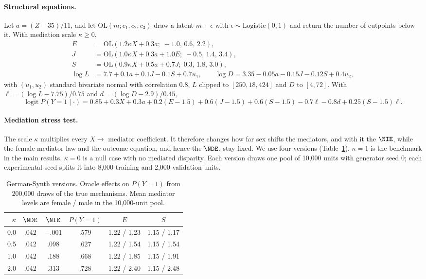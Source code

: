 \paragraph{Structural equations.}
Let $a=(Z-35)/11$, and let $\mathrm{OL}(m;c_1,c_2,c_3)$ draw a latent
$m+\epsilon$ with $\epsilon\sim\mathrm{Logistic}(0,1)$ and return the number
of cutpoints below it. With mediation scale $\kappa\ge0$,
\begin{align*}
  E &= \mathrm{OL}(1.2\kappa X+0.3a;\;-1.0,\,0.6,\,2.2),\\
  J &= \mathrm{OL}(1.0\kappa X+0.3a+1.0E;\;-0.5,\,1.4,\,3.4),\\
  S &= \mathrm{OL}(0.9\kappa X+0.5a+0.7J;\;0.3,\,1.8,\,3.0),\\
  \log L &= 7.7+0.1a+0.1J-0.1S+0.7u_1,\qquad
  \log D = 3.35-0.05a-0.15J-0.12S+0.4u_2,
\end{align*}
with $(u_1,u_2)$ standard bivariate normal with correlation $0.8$, $L$
clipped to $[250,18{,}424]$ and $D$ to $[4,72]$. With
$\ell=(\log L-7.75)/0.75$ and $d=(\log D-2.9)/0.45$,
\begin{equation*}
  \operatorname{logit}P(Y=1\mid\cdot)=0.85+0.3X+0.3a+0.2(E-1.5)+0.6(J-1.5)
  +0.6(S-1.5)-0.7\ell-0.8d+0.25(S-1.5)\ell .
\end{equation*}

\paragraph{Mediation stress test.}
The scale $\kappa$ multiplies every $X\to$ mediator coefficient. It
therefore changes how far sex shifts the mediators, and with it the $\NIE$,
while the female mediator law and the outcome equation, and hence the $\NDE$,
stay fixed. We use four versions (Table~\ref{tab:synth_versions}).
$\kappa=1$ is the benchmark in the main results. $\kappa=0$ is a null case
with no mediated disparity. Each version draws one pool of 10{,}000 units
with generator seed 0; each experimental seed splits it into 8{,}000
training and 2{,}000 validation units.

\begin{table}[h]
\centering
\small
\caption{German-Synth versions. Oracle effects on $P(Y=1)$ from 200{,}000
draws of the true mechanisms. Mean mediator levels are female / male in the
10{,}000-unit pool.}
\label{tab:synth_versions}
\setlength{\tabcolsep}{3.5pt}
\begin{tabular}{rccccc}
\hline
$\kappa$ & $\NDE$ & $\NIE$ & $P(Y=1)$ & $\bar E$ & $\bar S$ \\
\hline
0.0 & .042 & $-$.001 & .579 & 1.22 / 1.23 & 1.15 / 1.17 \\
0.5 & .042 & .098 & .627 & 1.22 / 1.54 & 1.15 / 1.54 \\
1.0 & .042 & .188 & .668 & 1.22 / 1.85 & 1.15 / 1.91 \\
2.0 & .042 & .313 & .728 & 1.22 / 2.40 & 1.15 / 2.48 \\
\hline
\end{tabular}
\end{table}

